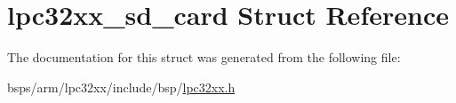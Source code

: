 \hypertarget{structlpc32xx__sd__card}{}\section{lpc32xx\+\_\+sd\+\_\+card Struct Reference}
\label{structlpc32xx__sd__card}


The documentation for this struct was generated from the following file\+:\begin{DoxyCompactItemize}
\item 
bsps/arm/lpc32xx/include/bsp/\mbox{\hyperlink{lpc32xx_8h}{lpc32xx.\+h}}\end{DoxyCompactItemize}
